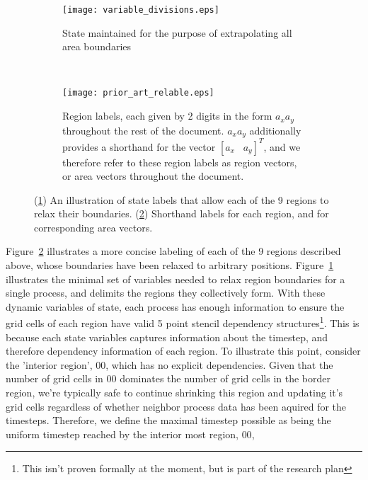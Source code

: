 \begin{figure}[t]
  \centering
  \begin{subfigure}[t]{.5\textwidth}
    \centering
    \texttt{[image: variable\_divisions.eps]}
    \caption{State maintained for the purpose of extrapolating all area boundaries}
    \label{fig:state_labels}
  \end{subfigure}
  ~
  \begin{subfigure}[t]{.4\textwidth}
    \centering
    \texttt{[image: prior\_art\_relable.eps]}
    \caption{Region labels, each given by 2 digits in the form $a_xa_y$ throughout the rest of the document.
    $a_xa_y$ additionally provides a shorthand for the vector $[a_x\;\;\; a_y]^T$, and we therefore refer to
    these region labels as region vectors, or area vectors throughout the document.}\label{fig:region_vectors}
    \end{subfigure}
  \caption{(\ref{fig:state_labels}) An illustration of state labels that allow each of the 9 regions to relax their
  boundaries.  (\ref{fig:region_vectors}) Shorthand labels for each region, and for corresponding area vectors.}
  \label{fig:local_decomposition}
\end{figure}

Figure~\ref{fig:region_vectors} illustrates a more concise labeling of
each of the 9 regions described above, whose boundaries have been relaxed to arbitrary positions.
  Figure~\ref{fig:state_labels} illustrates the minimal set of variables needed to relax region boundaries
for a single process, and delimits the regions they collectively form.
With these dynamic variables of state, each process has enough information
to ensure the grid cells
of each region have valid 5 point stencil dependency structures\footnote{
  This isn't proven formally at the moment, but is part of the research plan
}.
This is because each state variables captures information about the timestep,
and therefore dependency information of each region.  To illustrate this point,
consider the 'interior region', $00$, which
has no explicit dependencies.  Given that the number of grid cells in $00$
dominates the number of grid cells in the border region, we're typically safe to continue shrinking this region
and updating it's grid cells regardless of whether neighbor process data has been aquired for the timesteps.
Therefore, we define the maximal timestep possible as being the uniform timestep reached by the interior most
region, $00$,

